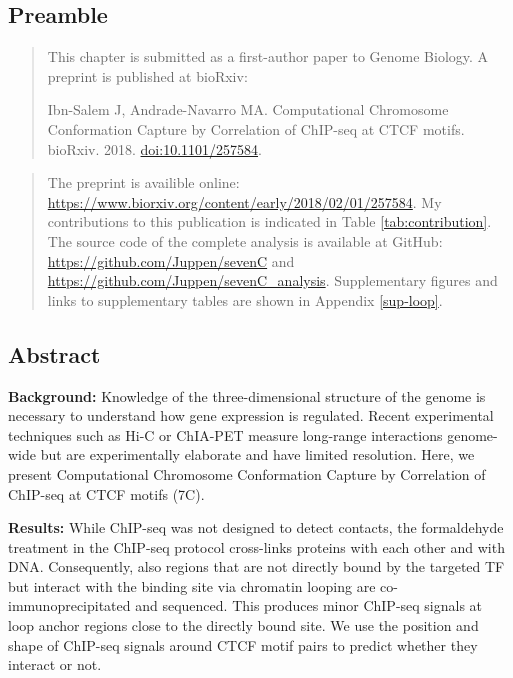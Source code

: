 \documentclass[a4paper,twoside=true,openright,parskip=full,chapterprefix=true,11pt,headings=normal,bibliography=totoc,listof=totoc,titlepage=on,captions=tableabove,draft=false]{scrreprt}
\theoremstyle{definition}
\theoremstyle{definition}
\theoremstyle{definition}
\theoremstyle{remark}
\begin{document}
\hypertarget{preamble-3}{%
\subsection*{Preamble}\label{preamble-3}}

\begin{quote}
This chapter is submitted as a first-author paper to Genome Biology. A
preprint is published at bioRxiv:

Ibn-Salem J, Andrade-Navarro MA. Computational Chromosome Conformation
Capture by Correlation of ChIP-seq at CTCF motifs. bioRxiv. 2018.
\href{https://doi.org/10.1101/257584}{doi:10.1101/257584}.
\end{quote}

\begin{quote}
The preprint is availible online:
\url{https://www.biorxiv.org/content/early/2018/02/01/257584}. My
contributions to this publication is indicated in Table
\ref{tab:contribution}. The source code of the complete analysis is
available at GitHub: \url{https://github.com/Juppen/sevenC} and
\url{https://github.com/Juppen/sevenC_analysis}. Supplementary figures
and links to supplementary tables are shown in Appendix \ref{sup-loop}.
\end{quote}

\hypertarget{abstract-4}{%
\subsection*{Abstract}\label{abstract-4}}

\textbf{Background:} Knowledge of the three-dimensional structure of the
genome is necessary to understand how gene expression is regulated.
Recent experimental techniques such as Hi-C or ChIA-PET measure
long-range interactions genome-wide but are experimentally elaborate and
have limited resolution. Here, we present Computational Chromosome
Conformation Capture by Correlation of ChIP-seq at CTCF motifs (7C).

\textbf{Results:} While ChIP-seq was not designed to detect contacts,
the formaldehyde treatment in the ChIP-seq protocol cross-links proteins
with each other and with DNA. Consequently, also regions that are not
directly bound by the targeted TF but interact with the binding site via
chromatin looping are co-immunoprecipitated and sequenced. This produces
minor ChIP-seq signals at loop anchor regions close to the directly
bound site. We use the position and shape of ChIP-seq signals around
CTCF motif pairs to predict whether they interact or not.
\end{document}
